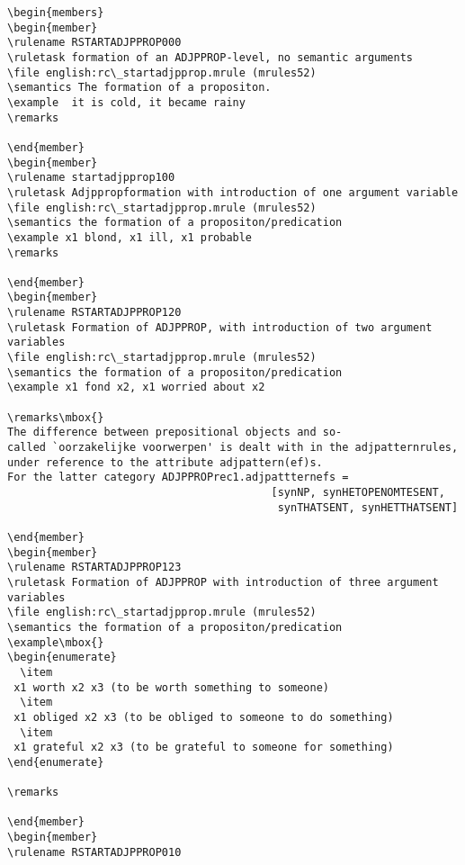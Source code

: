 \begin{verbatim}
\begin{members}
\begin{member}
\rulename RSTARTADJPPROP000
\ruletask formation of an ADJPPROP-level, no semantic arguments
\file english:rc\_startadjpprop.mrule (mrules52)
\semantics The formation of a propositon.
\example  it is cold, it became rainy 
\remarks

\end{member}
\begin{member}
\rulename startadjpprop100
\ruletask Adjppropformation with introduction of one argument variable
\file english:rc\_startadjpprop.mrule (mrules52)
\semantics the formation of a propositon/predication
\example x1 blond, x1 ill, x1 probable
\remarks

\end{member}
\begin{member}
\rulename RSTARTADJPPROP120
\ruletask Formation of ADJPPROP, with introduction of two argument 
variables
\file english:rc\_startadjpprop.mrule (mrules52)
\semantics the formation of a propositon/predication
\example x1 fond x2, x1 worried about x2

\remarks\mbox{}
The difference between prepositional objects and so-
called `oorzakelijke voorwerpen' is dealt with in the adjpatternrules, 
under reference to the attribute adjpattern(ef)s. 
For the latter category ADJPPROPrec1.adjpattternefs = 
                                         [synNP, synHETOPENOMTESENT, 
                                          synTHATSENT, synHETTHATSENT]

\end{member}
\begin{member}
\rulename RSTARTADJPPROP123 
\ruletask Formation of ADJPPROP with introduction of three argument 
variables
\file english:rc\_startadjpprop.mrule (mrules52)
\semantics the formation of a propositon/predication
\example\mbox{}
\begin{enumerate}
  \item 
 x1 worth x2 x3 (to be worth something to someone)
  \item
 x1 obliged x2 x3 (to be obliged to someone to do something)
  \item
 x1 grateful x2 x3 (to be grateful to someone for something)
\end{enumerate}

\remarks

\end{member}
\begin{member}
\rulename RSTARTADJPPROP010


\end{verbatim}
